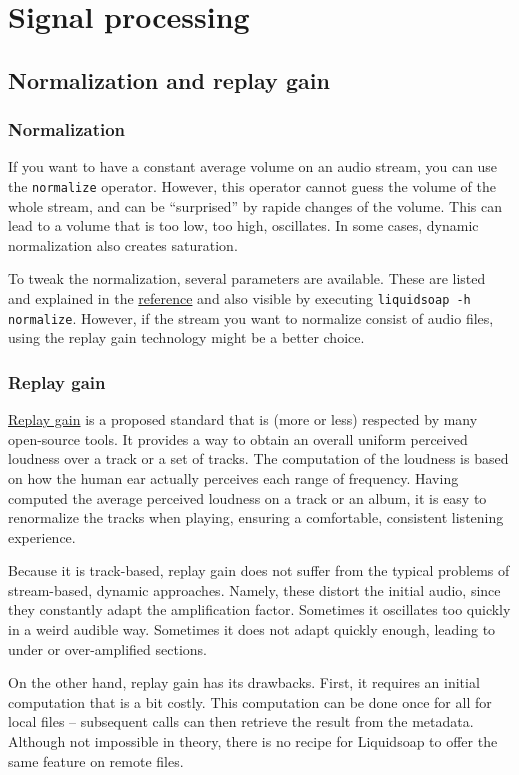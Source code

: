 \chapter{Signal processing}
\section{Normalization and replay gain}
\subsection{Normalization}
If you want to have a constant average volume on an audio stream, you can use
the \verb+normalize+ operator. However, this operator cannot guess the volume of
the whole stream, and can be ``surprised'' by rapide changes of the volume. This
can lead to a volume that is too low, too high, oscillates. In some cases,
dynamic normalization also creates saturation.

To tweak the normalization, several parameters are available. These are listed
and explained in the \href{reference.html}{reference} and also visible by
executing \verb+liquidsoap -h normalize+. However, if the stream you want to
normalize consist of audio files, using the replay gain technology might be a
better choice.

\subsection{Replay gain}
\href{http://www.replaygain.org}{Replay gain} is a proposed standard that is
(more or less) respected by many open-source tools. It provides a way to obtain
an overall uniform perceived loudness over a track or a set of tracks. The
computation of the loudness is based on how the human ear actually perceives
each range of frequency. Having computed the average perceived loudness on a
track or an album, it is easy to renormalize the tracks when playing, ensuring a
comfortable, consistent listening experience.

Because it is track-based, replay gain does not suffer from the typical problems
of stream-based, dynamic approaches. Namely, these distort the initial audio,
since they constantly adapt the amplification factor. Sometimes it oscillates
too quickly in a weird audible way. Sometimes it does not adapt quickly enough,
leading to under or over-amplified sections.

On the other hand, replay gain has its drawbacks. First, it requires an initial
computation that is a bit costly. This computation can be done once for all for
local files -- subsequent calls can then retrieve the result from the
metadata. Although not impossible in theory, there is no recipe for Liquidsoap
to offer the same feature on remote files.

